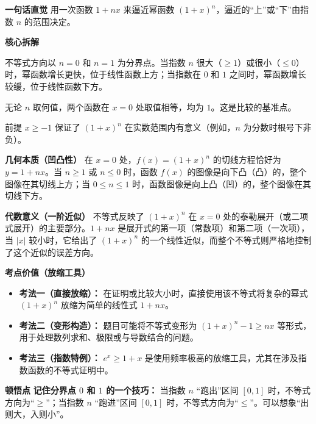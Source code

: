 \begin{explanationbox}
\textbf{\textcolor{CExplanation}{一句话直觉}}
用一次函数 $1+nx$ 来逼近幂函数 $(1+x)^n$，逼近的“上”或“下”由指数 $n$ 的范围决定。

\medskip
\textbf{\textcolor{CExplanation}{核心拆解}}
\begin{description}[style=nextline, leftmargin=2.8em, labelsep=0.5em, itemsep=0.45em]
    \item[\textbf{要点一（指数分界）：}] 不等式方向以 $n=0$ 和 $n=1$ 为分界点。当指数 $n$ 很大（$\geq1$）或很小（$\leq0$）时，幂函数增长更快，位于线性函数上方；当指数在 $0$ 和 $1$ 之间时，幂函数增长较缓，位于线性函数下方。
    \item[\textbf{要点二（零点锚定）：}] 无论 $n$ 取何值，两个函数在 $x=0$ 处取值相等，均为 $1$。这是比较的基准点。
    \item[\textbf{要点三（条件必要）：}] 前提 $x \geq -1$ 保证了 $(1+x)^n$ 在实数范围内有意义（例如，$n$ 为分数时根号下非负）。
\end{description}

\medskip
\textbf{\textcolor{CExplanation}{几何本质（凹凸性）}}
在 $x=0$ 处，$f(x)=(1+x)^n$ 的切线方程恰好为 $y=1+nx$。当 $n\geq1$ 或 $n\leq0$ 时，函数 $f(x)$ 的图像是向下凸（凸）的，整个图像在其切线上方；当 $0\leq n\leq1$ 时，函数图像是向上凸（凹）的，整个图像在其切线下方。

\medskip
\textbf{\textcolor{CExplanation}{代数意义（一阶近似）}}
不等式反映了 $(1+x)^n$ 在 $x=0$ 处的泰勒展开（或二项式展开）的主要部分。$1+nx$ 是展开式的第一项（常数项）和第二项（一次项），当 $|x|$ 较小时，它给出了 $(1+x)^n$ 的一个线性近似，而整个不等式则严格地控制了这个近似的误差方向。

\medskip
\textbf{\textcolor{CExplanation}{考点价值（放缩工具）}}
\begin{itemize}[leftmargin=*, itemsep=0.5em, topsep=0.4em]
    \item \textbf{考法一（直接放缩）：} 在证明或比较大小时，直接使用该不等式将复杂的幂式 $(1+x)^n$ 放缩为简单的线性式 $1+nx$。
    \item \textbf{考法二（变形构造）：} 题目可能将不等式变形为 $(1+x)^n - 1 \geq nx$ 等形式，用于处理数列求和、极限或与导数结合的问题。
    \item \textbf{考法三（指数特例）：} $e^x \geq 1+x$ 是使用频率极高的放缩工具，尤其在涉及指数函数的不等式证明中。
\end{itemize}

\medskip
\textbf{\textcolor{CExplanation}{顿悟点}}
\textbf{记住分界点 $0$ 和 $1$ 的一个技巧：} 当指数 $n$ “跑出”区间 $[0,1]$ 时，不等式方向为“$\geq$”；当指数 $n$ “跑进”区间 $[0,1]$ 时，不等式方向为“$\leq$”。可以想象“出则大，入则小”。


\end{explanationbox}
